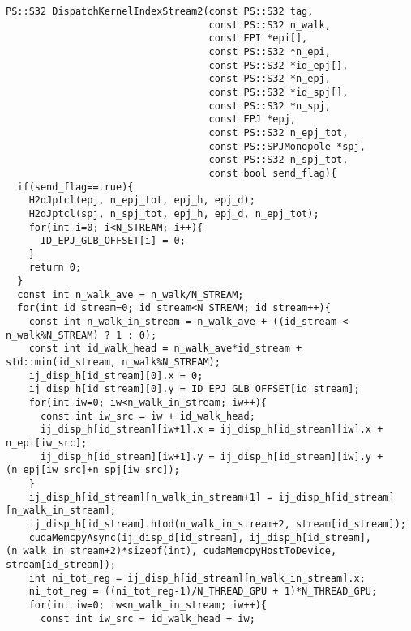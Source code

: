 \documentclass[10pt,onecolumn,a4paper,fleqn]{article}
\begin{document}

\begin{mdframed}[
    backgroundcolor=bg,
    topline=false,
    bottomline=false,
    leftline=false,
    rightline=false]
  \begin{verbatim}
PS::S32 DispatchKernelIndexStream2(const PS::S32 tag,
                                   const PS::S32 n_walk,
                                   const EPI *epi[],
                                   const PS::S32 *n_epi,
                                   const PS::S32 *id_epj[],
                                   const PS::S32 *n_epj,
                                   const PS::S32 *id_spj[],
                                   const PS::S32 *n_spj,
                                   const EPJ *epj,
                                   const PS::S32 n_epj_tot,
                                   const PS::SPJMonopole *spj,
                                   const PS::S32 n_spj_tot,
                                   const bool send_flag){
  if(send_flag==true){
    H2dJptcl(epj, n_epj_tot, epj_h, epj_d);
    H2dJptcl(spj, n_spj_tot, epj_h, epj_d, n_epj_tot);
    for(int i=0; i<N_STREAM; i++){
      ID_EPJ_GLB_OFFSET[i] = 0;
    }
    return 0;
  }
  const int n_walk_ave = n_walk/N_STREAM;
  for(int id_stream=0; id_stream<N_STREAM; id_stream++){
    const int n_walk_in_stream = n_walk_ave + ((id_stream < n_walk%N_STREAM) ? 1 : 0);
    const int id_walk_head = n_walk_ave*id_stream + std::min(id_stream, n_walk%N_STREAM);
    ij_disp_h[id_stream][0].x = 0;
    ij_disp_h[id_stream][0].y = ID_EPJ_GLB_OFFSET[id_stream];
    for(int iw=0; iw<n_walk_in_stream; iw++){
      const int iw_src = iw + id_walk_head;
      ij_disp_h[id_stream][iw+1].x = ij_disp_h[id_stream][iw].x +  n_epi[iw_src];
      ij_disp_h[id_stream][iw+1].y = ij_disp_h[id_stream][iw].y + (n_epj[iw_src]+n_spj[iw_src]);
    }
    ij_disp_h[id_stream][n_walk_in_stream+1] = ij_disp_h[id_stream][n_walk_in_stream];
    ij_disp_h[id_stream].htod(n_walk_in_stream+2, stream[id_stream]);
    cudaMemcpyAsync(ij_disp_d[id_stream], ij_disp_h[id_stream], (n_walk_in_stream+2)*sizeof(int), cudaMemcpyHostToDevice, stream[id_stream]);    
    int ni_tot_reg = ij_disp_h[id_stream][n_walk_in_stream].x;
    ni_tot_reg = ((ni_tot_reg-1)/N_THREAD_GPU + 1)*N_THREAD_GPU;
    for(int iw=0; iw<n_walk_in_stream; iw++){
      const int iw_src = id_walk_head + iw;

\end{verbatim}
\end{mdframed}
\end{document}
